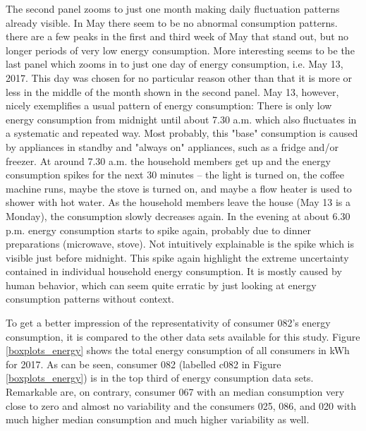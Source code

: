 The second panel zooms to just one month making daily fluctuation patterns already visible. In May there seem to be no abnormal consumption patterns. there are a few peaks in the first and third week of May that stand out, but no longer periods of very low energy consumption. More interesting seems to be the last panel which zooms in to just one day of energy consumption, i.e. May 13, 2017. This day was chosen for no particular reason other than that it is more or less in the middle of the month shown in the second panel. May 13, however, nicely exemplifies a usual pattern of energy consumption: There is only low energy consumption from midnight until about 7.30 a.m. which also fluctuates in a systematic and repeated way. Most probably, this "base" consumption is caused by appliances in standby and "always on" appliances, such as a fridge and/or freezer. At around 7.30 a.m. the household members get up and the energy consumption spikes for the next 30 minutes -- the light is turned on, the coffee machine runs, maybe the stove is turned on, and maybe a flow heater is used to shower with hot water. As the household members leave the house (May 13 is a Monday), the consumption slowly decreases again. In the evening at about 6.30 p.m. energy consumption starts to spike again, probably due to dinner preparations (microwave, stove). Not intuitively explainable is the spike which is visible just before midnight. This spike again highlight the extreme uncertainty contained in individual household energy consumption. It is mostly caused by human behavior, which can seem quite erratic by just looking at energy consumption patterns without context.

To get a better impression of the representativity of consumer 082's  energy consumption, it is compared to the other data sets available for this study. Figure \ref{boxplots_energy} shows the total energy consumption of all consumers in kWh for 2017. As can be seen, consumer 082 (labelled c082 in Figure \ref{boxplots_energy}) is in the top third of energy consumption  data sets. Remarkable are, on contrary, consumer 067 with an median consumption very close to zero and almost no variability and the consumers 025, 086, and 020 with much higher median consumption and much higher variability as well.

